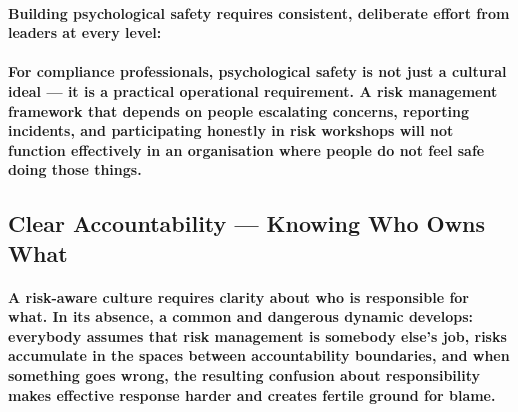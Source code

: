 \paragraph{Building psychological safety requires consistent, deliberate effort from leaders at every level:}
\begin{itemize}
\end{itemize}
\paragraph{For compliance professionals, psychological safety is not just a cultural ideal — it is a practical operational requirement. A risk management framework that depends on people escalating concerns, reporting incidents, and participating honestly in risk workshops will not function effectively in an organisation where people do not feel safe doing those things.}

\subsection{Clear Accountability — Knowing Who Owns What}
\paragraph{A risk-aware culture requires clarity about who is responsible for what. In its absence, a common and dangerous dynamic develops: everybody assumes that risk management is somebody else's job, risks accumulate in the spaces between accountability boundaries, and when something goes wrong, the resulting confusion about responsibility makes effective response harder and creates fertile ground for blame.}
